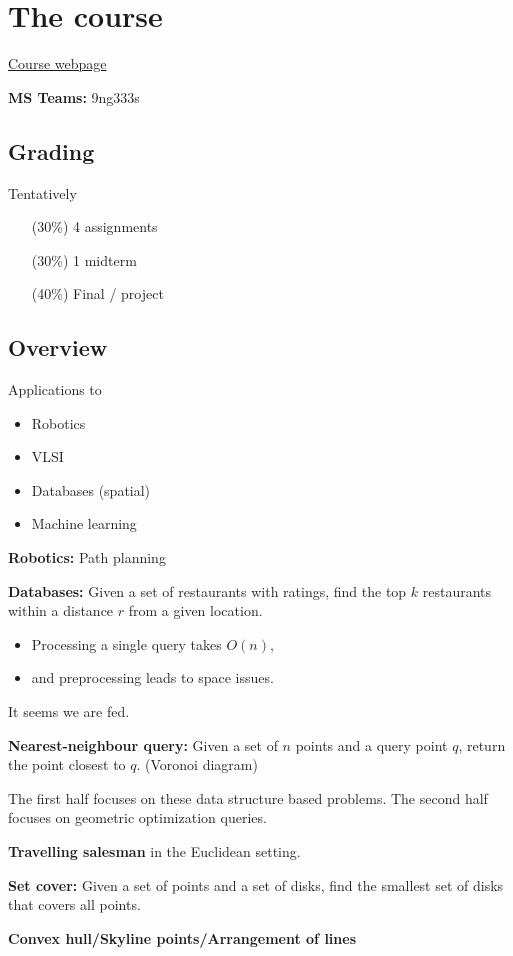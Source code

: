\chapter*{The course} \label{chp:course}

\href{https://www.csa.iisc.ac.in/~saladi/e0208/fa2024}{Course webpage}

\textbf{MS Teams:} 9ng333s

\section*{Grading}
Tentatively
\begin{itemize}
    \item[(30\%)] 4 assignments
    \item[(30\%)] 1 midterm
    \item[(40\%)] Final / project
\end{itemize}

\section*{Overview}
Applications to
\begin{itemize}
    \item Robotics
    \item VLSI
    \item Databases (spatial)
    \item Machine learning
\end{itemize}
\begin{examples}
    \item \textbf{Robotics:} Path planning
    \item \textbf{Databases:} Given a set of restaurants with ratings,
        find the top $k$ restaurants within a distance $r$ from a given
        location.
        \begin{itemize}
            \item Processing a single query takes $O(n)$,
            \item and preprocessing leads to space issues.
        \end{itemize}
        It seems we are fed.
    \item \textbf{Nearest-neighbour query:} Given a set of $n$ points and
        a query point $q$, return the point closest to $q$.
        (Voronoi diagram)
\end{examples}
The first half focuses on these data structure based problems.
The second half focuses on geometric optimization queries.
\begin{examples}
    \item \textbf{Travelling salesman} in the Euclidean setting.
    \item \textbf{Set cover:} Given a set of points and a set of disks,
        find the smallest set of disks that covers all points.
    \item \textbf{Convex hull/Skyline points/Arrangement of lines}
\end{examples}

